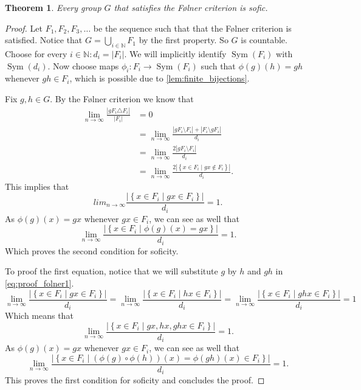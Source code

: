 \documentclass[a4paper]{memoir}
\newcommand{\N}{\mathbb{N}}
\newtheorem{theorem}{Theorem}
\DeclareMathOperator{\sym}{Sym}
\begin{document}
    \begin{theorem}
        Every group $G$ that satisfies the Følner criterion is sofic.
    \end{theorem}
    \begin{proof}
        Let $F_1, F_2, F_3, \dots $ be the sequence such that that the Følner criterion is satisfied. Notice that $G = \bigcup_{i \in \N} F_1$ by the first property. So $G$ is countable. 
        Choose for every $i \in \N: d_i = |F_i|$. We will implicitly identify $\sym(F_i)$ with $\sym(d_i)$. Now choose maps $\phi_i: F_i \to \sym(F_i)$ such that $\phi(g)(h) = gh$ whenever $gh \in F_i$, which is possible due to \cref{lem:finite_bijections}. 

        Fix $g, h \in G$. By the Følner criterion we know that
        \begin{align*}
            \lim_{n\to \infty} \frac{\left| gF_i \triangle F_i \right|}{\left| F_i \right|} &= 0\\
            &= \lim_{n\to \infty} \frac{\left| gF_i \setminus F_i \right| + \left| F_i \setminus gF_i \right|}{d_i}\\
            &= \lim_{n\to \infty} \frac{2\left| gF_i \setminus F_i \right|}{d_i}\\
            &= \lim_{n\to \infty} \frac{2\left|\left\{ x \in F_i \mid gx \notin F_i \right\}\right|}{d_i}. 
        \end{align*}
        This implies that \begin{equation}\label{eq:proof_folner1}
            lim_{n\to \infty} \frac{\left|\left\{ x \in F_i \mid gx \in F_i \right\}\right|}{d_i} = 1.
        \end{equation}
        As $\phi(g)(x) = gx$ whenever $gx \in F_i$, we can see as well that $$\lim_{n\to \infty} \frac{\left|\left\{ x \in F_i \mid \phi(g)(x) = gx \right\}\right|}{d_i} = 1.$$
        Which proves the second condition for soficity. 

        To proof the first equation, notice that we will substitute $g$ by $h$ and $gh$ in \cref{eq:proof_folner1}.
        $$ \lim_{n\to \infty} \frac{\left|\left\{ x \in F_i \mid gx \in F_i \right\}\right|}{d_i} =
        \lim_{n\to \infty} \frac{\left|\left\{ x \in F_i \mid hx \in F_i \right\}\right|}{d_i} =
        \lim_{n\to \infty} \frac{\left|\left\{ x \in F_i \mid ghx \in F_i \right\}\right|}{d_i}= 1$$
        Which means that 
        $$\lim_{n\to \infty} \frac{\left|\left\{ x \in F_i \mid gx,hx,ghx \in F_i \right\}\right|}{d_i}= 1.$$
        As $\phi(g)(x) = gx$ whenever $gx \in F_i$, we can see as well that
        $$\lim_{n\to \infty} \frac{\left|\left\{ x \in F_i \mid (\phi(g) \circ\phi(h))(x) = \phi(gh)(x) \in F_i \right\}\right|}{d_i}= 1.$$
        This proves the first condition for soficity and concludes the proof. 
    \end{proof}
\end{document}
